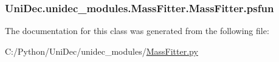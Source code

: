 \subsubsection[{psfun}]{\setlength{\rightskip}{0pt plus 5cm}Uni\+Dec.\+unidec\+\_\+modules.\+Mass\+Fitter.\+Mass\+Fitter.\+psfun}\label{class_uni_dec_1_1unidec__modules_1_1_mass_fitter_1_1_mass_fitter_ad57b1b5e2d1d395762b08ec71887bb14}


The documentation for this class was generated from the following file\+:\begin{DoxyCompactItemize}
\item 
C\+:/\+Python/\+Uni\+Dec/unidec\+\_\+modules/\hyperlink{_mass_fitter_8py}{Mass\+Fitter.\+py}\end{DoxyCompactItemize}

